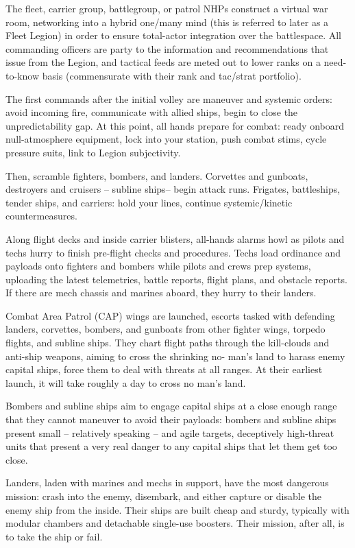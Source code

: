 The fleet, carrier group, battlegroup, or patrol NHPs construct a virtual war room, networking into
a hybrid one/many mind (this is referred to later as a Fleet Legion) in order to ensure total-actor
integration over the battlespace. All commanding officers are party to the information and
recommendations that issue from the Legion, and tactical feeds are meted out to lower ranks on
a need-to-know basis (commensurate with their rank and tac/strat portfolio).

The first commands after the initial volley are maneuver and systemic orders: avoid incoming fire,
communicate with allied ships, begin to close the unpredictability gap. At this point, all hands
prepare for combat: ready onboard null-atmosphere equipment, lock into your station, push
combat stims, cycle pressure suits, link to Legion subjectivity.

Then, scramble fighters, bombers, and landers. Corvettes and gunboats, destroyers and cruisers
-- subline ships-- begin attack runs. Frigates, battleships, tender ships, and carriers: hold your
lines, continue systemic/kinetic countermeasures.

Along flight decks and inside carrier blisters, all-hands alarms howl as pilots and techs hurry to
finish pre-flight checks and procedures. Techs load ordinance and payloads onto fighters and
bombers while pilots and crews prep systems, uploading the latest telemetries, battle reports,
flight plans, and obstacle reports. If there are mech chassis and marines aboard, they hurry to
their landers.

Combat Area Patrol (CAP) wings are launched, escorts tasked with defending landers, corvettes,
bombers, and gunboats from other fighter wings, torpedo flights, and subline ships. They chart
flight paths through the kill-clouds and anti-ship weapons, aiming to cross the shrinking no-
man's land to harass enemy capital ships, force them to deal with threats at all ranges. At their
earliest launch, it will take roughly a day to cross no man's land.

Bombers and subline ships aim to engage capital ships at a close enough range that they cannot
maneuver to avoid their payloads: bombers and subline ships present small -- relatively speaking
-- and agile targets, deceptively high-threat units that present a very real danger to any capital
ships that let them get too close.

Landers, laden with marines and mechs in support, have the most dangerous mission: crash into
the enemy, disembark, and either capture or disable the enemy ship from the inside. Their ships
are built cheap and sturdy, typically with modular chambers and detachable single-use boosters.
Their mission, after all, is to take the ship or fail.

